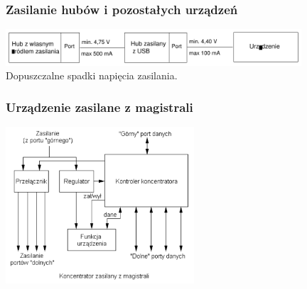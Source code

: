 \documentclass[a4paper,twoside]{article}
\begin{document}
	\subsubsection{Zasilanie hubów i pozostałych urządzeń}
		\includegraphics[width=11cm]{./wyklady/USB_38_1.pdf}\\
		Dopuszczalne spadki napięcia zasilania.
	\subsubsection{Urządzenie zasilane z magistrali}
		\includegraphics[width=7cm]{./wyklady/USB_39_1.pdf}
\end{document}
